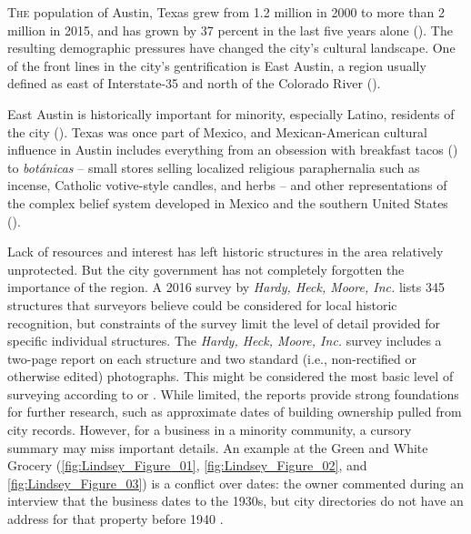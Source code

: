 \IJSRAopening%
\lettrine{T}{he} population of Austin, Texas grew from \num{1.2} million in 2000 to more than \num{2} million in 2015, and has grown by \num{37} percent in the last five years alone (\cite{kerr}). The resulting demographic pressures have changed the city's cultural landscape. One of the front lines in the city's gentrification is East Austin, a region usually defined as east of Interstate-35 and north of the Colorado River (\cite{hernandez}).

East Austin is historically important for minority, especially Latino, residents of the city (\cite{hernandez}). Texas was once part of Mexico, and Mexican-American cultural influence in Austin includes everything from an obsession with breakfast tacos (\cite{hernandez}) to \emph{botánicas}
-- small stores selling localized religious paraphernalia such as incense, Catholic votive-style candles, and herbs --
and other representations of the complex belief system developed in Mexico and the southern United States (\cite{kreneck}).

Lack of resources and interest has left historic structures in the area relatively unprotected. But the city government has not completely forgotten the importance of the region. A 2016 survey by \emph{Hardy, Heck, Moore, Inc.} lists \num{345} structures that surveyors believe could be considered for local historic recognition, but constraints of the survey limit the level of detail provided for specific individual structures. The \emph{Hardy, Heck, Moore, Inc.} survey includes a two-page report on each structure and two standard (i.e., non-rectified or otherwise edited) photographs. This might be considered the most basic level of surveying according to \textcite[25]{lane} or \textcite[370]{pluciennik}.
While limited, the reports provide strong foundations for further research, such as approximate dates of building ownership pulled from city records. However, for a business in a minority community, a cursory summary may miss important details.
An example at the Green and White Grocery (\cref{fig:Lindsey_Figure_01}, \cref{fig:Lindsey_Figure_02}, and \cref{fig:Lindsey_Figure_03}) is a conflict over dates: the owner commented during an interview that the business dates to the 1930s, but city directories do not have an address for that property before 1940
\parencite[75-76]{hardy}.

